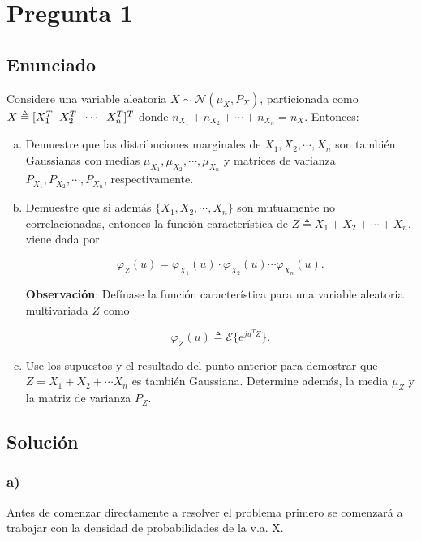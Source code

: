 \section{ Pregunta 1 }

	\subsection{ Enunciado }
		Considere una variable aleatoria $X \sim \mathcal{ N } (\mu_X, P_X)$,
		particionada como $X\triangleq [ X_1^T \;\; X_2^T \;\; \cdots \;\; X_n^T]^T$ donde
		$n_{X_1}+n_{X_2}+\cdots +n_{X_n}=n_X$. Entonces:
		\begin{enumerate}[a)]
		\item Demuestre que las distribuciones marginales de $X_1, X_2,\cdots, X_n$ son también Gaussianas con medias $\mu_{X_1}, \mu_{X_2}, \cdots, \mu_{X_n}$
		y matrices de varianza $P_{X_1}, P_{X_2}, \cdots, P_{X_n}$, respectivamente.


		\item Demuestre que si además $\lbrace X_1, X_2,\cdots, X_n \rbrace$ son mutuamente no correlacionadas, entonces la función característica de $Z \triangleq X_1+X_2+ \cdots + X_n$, viene dada por

		\begin{equation*}
		\varphi_{Z}(u) = \varphi_{X_1}(u) \cdot \varphi_{X_2}(u)  \cdots  \varphi_{X_n}(u).
		\end{equation*}

		\textbf{Observación}: Defínase la función característica para una variable aleatoria multivariada $Z$ como

		\begin{equation*}
		\varphi_{Z}(u)\triangleq \mathcal{E} \lbrace e^{ju^TZ} \rbrace.
		\end{equation*}

		\item Use los supuestos y el resultado del punto anterior para demostrar que $Z=X_1+X_2+ \cdots X_n$ es también Gaussiana. Determine además, la media $\mu_Z$ y la matriz de varianza $P_Z$.
		\end{enumerate}


	\subsection{ Solución }
	\subsubsection{ a) }
		Antes de comenzar directamente a resolver el problema primero se comenzará a trabajar con la densidad de probabilidades de la v.a. X.

